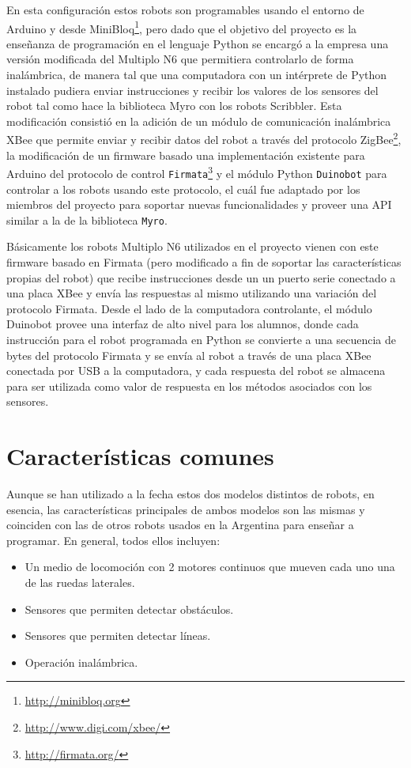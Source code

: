 En esta configuración estos robots son programables usando el entorno de
Arduino y desde MiniBloq\footnote{\url{http://minibloq.org}}, pero dado que el objetivo del proyecto es la enseñanza de
programación en el lenguaje Python se encargó a la empresa una versión
modificada del Multiplo N6 que permitiera controlarlo de forma inalámbrica,
de manera tal que una computadora con un intérprete de Python instalado
pudiera enviar instrucciones y recibir los valores de los sensores
del robot tal como hace la biblioteca Myro con los robots Scribbler.
Esta
modificación consistió en la adición de un módulo de comunicación inalámbrica
XBee
que permite enviar y recibir datos del robot a través del protocolo
ZigBee\footnote{\url{http://www.digi.com/xbee/}}, la modificación de
un firmware basado una implementación existente para Arduino del protocolo
de control \texttt{Firmata}\footnote{\url{http://firmata.org/}} y
el módulo Python \texttt{Duinobot} para controlar a los robots usando
este protocolo, el
cuál fue adaptado por los miembros del proyecto \proyecto{}
para soportar nuevas funcionalidades y proveer una
API similar a la de la biblioteca
\texttt{Myro}\citep{lanfranco_2012}.

Básicamente los robots Multiplo N6 utilizados en el proyecto \proyecto{} vienen
con este firmware basado en Firmata (pero modificado a fin de soportar
las características propias del robot) que recibe instrucciones desde
un un puerto serie conectado a una placa XBee y envía las respuestas
al mismo utilizando una variación del protocolo Firmata. Desde el lado
de la computadora controlante, el módulo Duinobot provee una interfaz
de alto nivel para los alumnos, donde cada instrucción para el robot
programada
en Python se convierte a una secuencia de bytes del protocolo Firmata
y se envía al robot a través de una placa XBee conectada por USB a la
computadora, y cada respuesta del robot se almacena para ser utilizada
como valor de respuesta en los métodos asociados con los sensores.


\section{Características comunes}
Aunque se han utilizado a la fecha estos dos modelos distintos de robots,
en esencia, las características principales de ambos modelos son las mismas
y coinciden con las de otros robots usados en la Argentina para enseñar a
programar. En general, todos ellos incluyen:
\begin{itemize}
    \item Un medio de locomoción  con 2 motores continuos que mueven cada
        uno una de las ruedas laterales.
    \item Sensores que permiten detectar obstáculos.
    \item Sensores que permiten detectar líneas.
    \item Operación inalámbrica.
\end{itemize}

